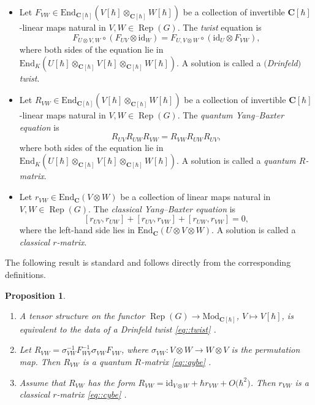 \documentclass[pdftex]{sigma}
\numberwithin{equation}{section}
\newtheorem{Proposition}[Theorem]{Proposition}
{ \theoremstyle{definition}
	\newtheorem{Definition}[Theorem]{Definition}
	\newtheorem{Note}[Theorem]{Note}
	\newtheorem{Example}[Theorem]{Example}
	\newtheorem{Remark}[Theorem]{Remark} }
\newcommand{\C}{\mathbf{C}}
\newcommand{\Mod}[1]{{\mathrm{Mod}}_{#1}}
\newcommand{\End}{\mathrm{End}}
\newcommand{\id}{\mathrm{id}}
\DeclareMathOperator{\Rep}{Rep}
\begin{document}
	\begin{Definition}
		\label{def::all_constant}\qquad
		\begin{itemize}\itemsep=0pt
			\item Let $F_{VW} \in \End_{\C[\hbar]}(V[\hbar]\otimes_{\C[\hbar]} W[\hbar]) $ be a collection of invertible $\C[\hbar]$-linear maps natural in $V,W\in \Rep(G)$. The \emph{twist} equation is
			\begin{equation}
				\label{eq::twist}
				F_{U \otimes V,W} \circ (F_{UV} \otimes \id_W) = F_{U,V\otimes W} \circ (\id_U \otimes F_{VW}),
			\end{equation}
			where both sides of the equation lie in $\End_K(U[\hbar] \otimes_{\C[\hbar]} V[\hbar] \otimes_{\C[\hbar]} W[\hbar])$. A solution is called a \emph{$($Drinfeld$)$ twist}.
			\item Let $R_{VW}\in \End_{\C[\hbar]}(V[\hbar]\otimes_{\C[\hbar]} W[\hbar]) $ be a collection of invertible $\C[\hbar]$-linear maps natural in $V,W\in \Rep(G)$. The \emph{quantum Yang--Baxter equation} is
			\begin{equation}
				\label{eq::qybe}
				R_{UV} R_{UW} R_{VW} = R_{VW} R_{UW} R_{UV},
			\end{equation}
			where both sides of the equation lie in $\End_K(U[\hbar] \otimes_{\C[\hbar]} V[\hbar] \otimes_{\C[\hbar]} W[\hbar])$. A solution is called a \emph{quantum $R$-matrix}.
			\item Let $r_{VW}\in \End_{\C}(V\otimes W) $ be a collection of linear maps natural in $V,W\in \Rep(G)$. The \emph{classical Yang--Baxter equation} is
			\begin{equation}
				\label{eq::cybe}
				[r_{UV},r_{UW}] + [r_{UV},r_{VW}] + [r_{UW}, r_{VW}] = 0,
			\end{equation}
			where the left-hand side lies in $\End_{\C}(U \otimes V \otimes W)$. A solution is called a \emph{classical $r$-matrix}.
		\end{itemize}
	\end{Definition}
	
	The following result is standard and follows directly from the corresponding definitions.
	\begin{Proposition}\qquad
		\begin{enumerate}\itemsep=0pt
			\item[$(1)$] A tensor structure on the functor
$
			\Rep(G) \rightarrow \Mod{\C[\hbar]}$, $ V \mapsto V[\hbar]$,
			is equivalent to the data of a Drinfeld twist \eqref{eq::twist} {\rm\cite[\emph{Definition} 2.4.1]{EGNO}}.
			\item[$(2)$] Let $R_{VW} = \sigma_{VW}^{-1} F_{WV}^{-1} \sigma_{VW} F_{VW}$, where $\sigma_{VW} \colon V \otimes W \rightarrow W \otimes V$ is the permutation map. Then $R_{VW}$ is a quantum $R$-matrix \eqref{eq::qybe} {\rm\cite[\emph{Definition} 8.1.1]{EGNO}}.
			\item[$(3)$] Assume that $R_{VW}$ has the form $R_{VW} = \id_{V \otimes W} + \hbar r_{VW} + O\bigl(\hbar^2\bigr)$. Then $r_{VW}$ is a classical $r$-matrix \eqref{eq::cybe} {\rm\cite[\emph{Proposition} 9.4]{EtingofSchiffmannQuantumGroups}}.
		\end{enumerate}
	\end{Proposition}
	
\end{document}
